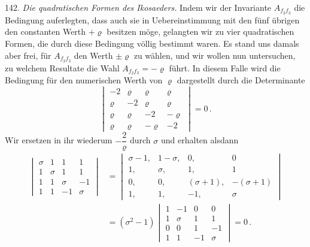 142. %
\textit{Die quadratischen Formen des Ikosaeders.} Indem wir der Invariante $A_{f_2f_3}$ die Bedingung auferlegten, dass auch sie in Uebereinstimmung mit den fünf übrigen den constanten Werth $+\varrho$ besitzen möge, gelangten wir zu vier quadratischen Formen, die durch diese Bedingung völlig bestimmt waren. Es stand uns damals aber frei, für $A_{f_2f_3}$ den Werth $\pm\varrho$ zu wählen, und wir wollen nun untersuchen, zu welchem Resultate die Wahl $A_{f_2f_3}=-\varrho$ führt. In diesem Falle wird die Bedingung für den numerischen Werth von $\varrho$ dargestellt durch die Determinante
\[
\begin{vmatrix}
-2 & \varrho & \varrho & \varrho\\
\varrho & -2 & \varrho & \varrho\\
\varrho & \varrho & -2 & -\varrho\\
\varrho & \varrho & -\varrho & -2
\end{vmatrix} = 0\,.
\]
Wir ersetzen in ihr wiederum $-\dfrac{2}{\varrho}$ durch $\sigma$ und erhalten alsdann
\[
\begin{aligned}
\begin{vmatrix}
\sigma & 1 & 1 & 1\\
1 & \sigma & 1 & 1\\
1 & 1 & \sigma & -1\\
1 & 1 & -1 & \sigma
\end{vmatrix}
&=
\begin{vmatrix}
\sigma-1, & 1-\sigma, & 0, & 0\\
1, & \sigma, & 1, & 1\\
0, & 0, & (\sigma+1), & -(\sigma+1)\\
1, & 1, & -1, & \sigma
\end{vmatrix}\\[4pt]
&= (\sigma^2-1)
\begin{vmatrix}
1 & -1 & 0 & 0\\
1 & \sigma & 1 & 1\\
0 & 0 & 1 & -1\\
1 & 1 & -1 & \sigma
\end{vmatrix} = 0\,.
\end{aligned}
\]


